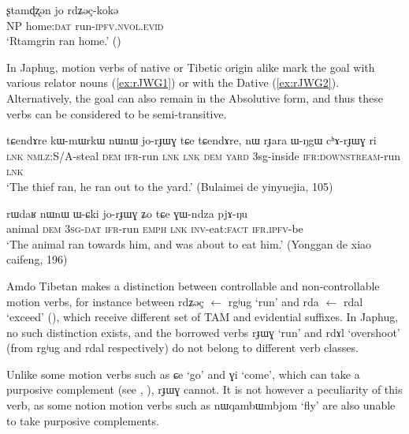 \documentclass[oldfontcommands,oneside,a4paper,11pt]{article}
\newcommand{\ipa}[1]{{\phon \mbox{#1}}} %
\begin{document}
\begin{exe}
\ex \label{ex:rgyug}
\gll
\ipa{ʂtamɖʐən} 	\ipa{jo} \ipa{rdʑəç-kokə} 	 \\
NP home:\textsc{dat} run-\textsc{ipfv.nvol.evid} \\
\glt `Rtamgrin ran home.' (\citealt[80, ex. 125]{haller04themchen})
\end{exe}

In Japhug, motion verbs of native or Tibetic origin alike mark the goal with various relator nouns (\ref{ex:rJWG1}) or with the Dative (\ref{ex:rJWG2}). Alternatively, the goal can also remain in the Absolutive form, and thus these verbs can be considered to be semi-transitive. 

\begin{exe}
\ex \label{ex:rJWG1}
\gll
\ipa{tɕendɤre}  	\ipa{kɯ-mɯrkɯ}  	\ipa{nɯnɯ}  	\ipa{jo-rɟɯɣ}  	\ipa{tɕe}  	\ipa{tɕendɤre,}  	\ipa{nɯ}  	\ipa{rɟara}  	\ipa{ɯ-ŋgɯ}  	\ipa{cʰɤ-rɟɯɣ}  	\ipa{ri}  \\
\textsc{lnk} \textsc{nmlz}:S/A-steal \textsc{dem} \textsc{ifr}-run \textsc{lnk} \textsc{lnk} \textsc{dem} \textsc{yard} 3sg-inside \textsc{ifr:downstream}-run \textsc{lnk} \\
\glt `The thief ran, he ran out to the yard.' (Bulaimei de yinyuejia, 105)
\end{exe}

\begin{exe}
\ex \label{ex:rJWG2}
\gll
\ipa{rɯdaʁ}  	\ipa{nɯnɯ}  	\ipa{ɯ-ɕki}  	\ipa{jo-rɟɯɣ}  	\ipa{ʑo}  	\ipa{tɕe}  	\ipa{ɣɯ-ndza}  	\ipa{pjɤ-ŋu}  \\
animal \textsc{dem} \textsc{3sg-dat} \textsc{ifr}-run \textsc{emph} \textsc{lnk} \textsc{inv}-eat:\textsc{fact} \textsc{ifr.ipfv}-be \\
\glt `The animal ran towards him, and was about to eat him.' (Yonggan de xiao caifeng, 196)
\end{exe}


Amdo Tibetan makes a distinction between controllable and non-controllable motion verbs, for instance between \ipa{rdʑəç} $\leftarrow$ \ipa{rgʲug} `run' and \ipa{rda} $\leftarrow$ \ipa{rdal} `exceed' (\citealt[123, ex. 543]{haller04themchen}), which receive different set of TAM and evidential suffixes. In Japhug, no such distinction exists, and  the borrowed verbs \ipa{rɟɯɣ} `run' and \ipa{rdɤl} `overshoot' (from \ipa{rgʲug} and \ipa{rdal} respectively) do not belong to different verb classes.


Unlike some motion verbs such as \ipa{ɕe} `go' and \ipa{ɣi} `come', which can take a purposive complement (see \citealt{sun12complementation}, \citealt{jacques13harmonization}), \ipa{rɟɯɣ} cannot. It is not however a peculiarity of this verb, as some notion motion verbs such as \ipa{nɯqambɯmbjom} `fly' are also unable to take purposive complements.
\end{document}
